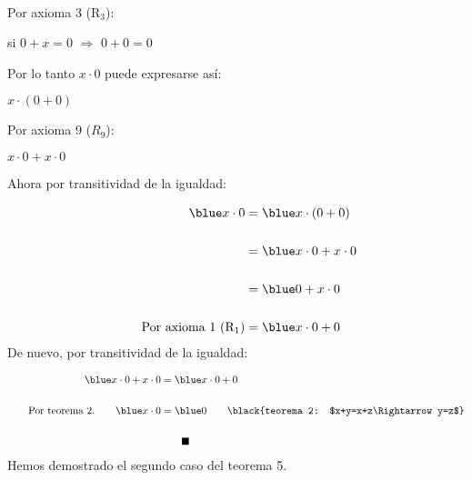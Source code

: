 \documentclass[12pt]{article}
\renewcommand{\qedsymbol}{$\blacksquare$}
\begin{document}
{}\\

Por axioma 3 (R$_3$):

\begin{center}
\blue
   si  $ 0 + x = 0 $ $ \Rightarrow $ $ 0 + 0 = 0$
\end{center}
\newpage

Por lo tanto $x\cdot 0$ puede expresarse así:
\begin{center}
\blue
    $x\cdot (0+0)$
\end{center}

Por axioma 9 ($R_9$):

\begin{center}
\blue
    $x\cdot 0 + x \cdot 0$
\end{center}

Ahora por transitividad de la igualdad:

\begin{equation*}
    \begin{split}
    \blue
        x \cdot 0 & = \blue x \cdot (0 + 0) \\\\ 
        & = \blue x \cdot 0 + x \cdot 0\\\\ 
         & =\blue  0 + x \cdot 0\\\\ 
       \qquad \textup{Por axioma 1 (R$_1$)}  & =\blue   x \cdot 0 + 0 
    \end{split}
\end{equation*}
De nuevo, por transitividad de la igualdad:

\begin{equation*}
    \begin{split}
    \blue
        x \cdot 0 +  x \cdot 0 & = \blue x \cdot 0 + 0 \\\\ 
       \qquad \textup{Por teorema 2.} \qquad \blue x \cdot 0 & =\blue 0 \qquad \textup{{\black{teorema 2: $x+y=x+z\Rightarrow y=z$}}}\\\\
       & \qquad \textup{\qedsymbol}
    \end{split}
\end{equation*}
Hemos demostrado el segundo caso del teorema 5. 

\newpage

\section*{}
\end{document}

